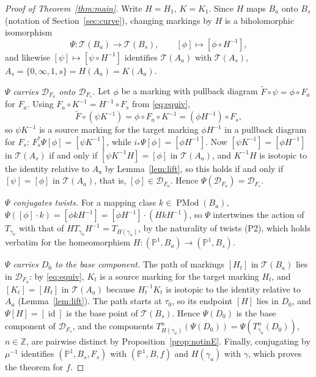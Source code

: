 \documentclass[12pt]{article}
\newcommand{\Pone}{\mathbb P^1}
\newcommand{\Z}{\mathbb Z}
\newcommand{\Teich}{\mathcal T}
\newcommand{\D}{\mathcal D}
\newcommand{\id}{\operatorname{id}}
\newcommand{\PMod}{\operatorname{PMod}}
\theoremstyle{remark}
\numberwithin{equation}{section}
\begin{document}
\begin{proof}[Proof of Theorem~\ref{thm:main}]
Write $H=H_1$, $K=K_1$. Since $H$ maps $B_a$ onto $B_s$ (notation of
Section~\ref{sec:curve}), changing markings by $H$ is a biholomorphic
isomorphism
\[
 \Psi\colon\Teich(B_a)\longrightarrow\Teich(B_s),\qquad
 [\phi]\longmapsto[\phi\circ H^{-1}],
\]
and likewise $[\psi]\mapsto[\psi\circ H^{-1}]$ identifies $\Teich(A_a)$
with $\Teich(A_s)$, $A_s=\{0,\infty,1,s\}=H(A_a)=K(A_a)$.

\emph{$\Psi$ carries $\D_{F_a}$ onto $\D_{F_s}$.} Let $\phi$ be a marking
with pullback diagram $\widetilde F\circ\psi=\phi\circ F_a$ for $F_a$.
Using $F_a\circ K^{-1}=H^{-1}\circ F_s$ from \eqref{eq:equiv},
\[
 \widetilde F\circ(\psi K^{-1})=\phi\circ F_a\circ K^{-1}
 =(\phi H^{-1})\circ F_s ,
\]
so $\psi K^{-1}$ is a source marking for the target marking $\phi H^{-1}$
in a pullback diagram for $F_s$: $F_s^*\Psi[\phi]=[\psi K^{-1}]$, while
$i_*\Psi[\phi]=[\phi H^{-1}]$. Now $[\psi K^{-1}]=[\phi H^{-1}]$ in
$\Teich(A_s)$ if and only if $[\psi K^{-1}H]=[\phi]$ in $\Teich(A_a)$, and
$K^{-1}H$ is isotopic to the identity relative to $A_a$ by
Lemma~\ref{lem:lift}, so this holds if and only if $[\psi]=[\phi]$ in
$\Teich(A_a)$, that is, $[\phi]\in\D_{F_a}$. Hence
$\Psi(\D_{F_a})=\D_{F_s}$.

\emph{$\Psi$ conjugates twists.} For a mapping class $k\in\PMod(B_a)$,
$\Psi([\phi]\cdot k)=[\phi kH^{-1}]=[\phi H^{-1}]\cdot(HkH^{-1})$, so $\Psi$
intertwines the action of $T_{\gamma_a}$ with that of
$HT_{\gamma_a}H^{-1}=T_{H(\gamma_a)}$, by the naturality of twists (P2),
which holds verbatim for the homeomorphism $H\colon(\Pone,B_a)\to(\Pone,B_s)$.

\emph{$\Psi$ carries $D_0$ to the base component.} The path of markings
$[H_t]$ in $\Teich(B_a)$ lies in $\D_{F_a}$: by \eqref{eq:equiv}, $K_t$ is
a source marking for the target marking $H_t$, and $[K_t]=[H_t]$ in
$\Teich(A_a)$ because $H_t^{-1}K_t$ is isotopic to the identity relative to
$A_a$ (Lemma~\ref{lem:lift}). The path starts at $\tau_0$, so its endpoint
$[H]$ lies in $D_0$, and $\Psi[H]=[\id]$ is the base point of
$\Teich(B_s)$. Hence $\Psi(D_0)$ is the base component of $\D_{F_s}$, and
the components $T_{H(\gamma_a)}^n(\Psi(D_0))=\Psi(T_{\gamma_a}^n(D_0))$,
$n\in\Z$, are pairwise distinct by Proposition~\ref{prop:notinE}. Finally,
conjugating by $\mu^{-1}$ identifies $(\Pone,B_s,F_s)$ with $(\Pone,B,f)$
and $H(\gamma_a)$ with $\gamma$, which proves the theorem for $f$.
\end{proof}
\end{document}
